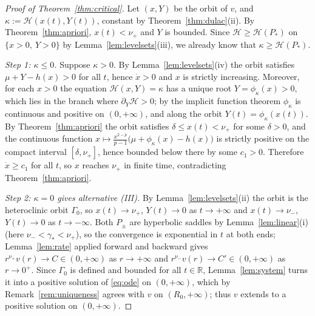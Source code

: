 \documentclass[11pt,reqno]{amsart}
\numberwithin{equation}{section}
\theoremstyle{plain}
\theoremstyle{definition}
\newcommand{\R}{\mathbb{R}}
\newcommand{\gs}{\gamma_{*}}
\begin{document}
\begin{proof}[Proof of Theorem~\ref{thm:critical}]
Let $(x,Y)$ be the orbit of $v$, and $\kappa:=\mathcal H(x(t),Y(t))$, constant by
Theorem~\ref{thm:dulac}(ii). By Theorem~\ref{thm:apriori}, $x(t)<\nu_{+}$ and
$Y$ is bounded. Since $\mathcal H\ge\mathcal H(P_{*})$ on $\{x>0,\ Y>0\}$ by
Lemma~\ref{lem:levelsets}(iii), we already know that
$\kappa\ge\mathcal H(P_{*})$.

\smallskip
\noindent\emph{Step 1: $\kappa\le0$.} Suppose $\kappa>0$. By
Lemma~\ref{lem:levelsets}(iv) the orbit satisfies $\mu+Y-h(x)>0$ for all $t$,
hence $\dot x>0$ and $x$ is strictly increasing. Moreover, for each $x>0$ the
equation $\mathcal H(x,Y)=\kappa$ has a unique root $Y=\phi_{\kappa}(x)>0$,
which lies in
the branch where $\partial_{Y}\mathcal H>0$; by the implicit function theorem
$\phi_{\kappa}$ is continuous and positive on $(0,+\infty)$, and along the orbit
$Y(t)=\phi_{\kappa}(x(t))$. By Theorem~\ref{thm:apriori} the orbit satisfies
$\delta\le x(t)<\nu_{+}$ for some $\delta>0$, and the continuous function
$x\mapsto\frac{x^{2-p}}{p-1}\big(\mu+\phi_{\kappa}(x)-h(x)\big)$ is strictly
positive on the compact interval $[\delta,\nu_{+}]$, hence bounded below there
by some $c_{1}>0$. Therefore $\dot x\ge c_{1}$ for all $t$, so $x$ reaches
$\nu_{+}$ in finite time, contradicting Theorem~\ref{thm:apriori}.

\smallskip
\noindent\emph{Step 2: $\kappa=0$ gives alternative {\rm(III)}.} By
Lemma~\ref{lem:levelsets}(ii) the orbit is the heteroclinic orbit
$\Gamma_{0}$, so $x(t)\to\nu_{+}$, $Y(t)\to0$ as $t\to+\infty$ and
$x(t)\to\nu_{-}$, $Y(t)\to0$ as $t\to-\infty$. Both $P_{\pm}$ are hyperbolic
saddles by Lemma~\ref{lem:linear}(i) (here $\nu_{-}<\gs<\nu_{+}$), so the
convergence is exponential in $t$ at both ends; Lemma~\ref{lem:rate} applied
forward and backward gives
$r^{\nu_{+}}v(r)\to C\in(0,+\infty)$ as $r\to+\infty$ and
$r^{\nu_{-}}v(r)\to C'\in(0,+\infty)$ as $r\to0^{+}$. Since $\Gamma_{0}$ is
defined and bounded for all $t\in\R$, Lemma~\ref{lem:system} turns it into a
positive solution of \eqref{eq:ode} on $(0,+\infty)$, which by
Remark~\ref{rem:uniqueness} agrees with $v$ on $(R_{0},+\infty)$; thus $v$
extends to a positive solution on $(0,+\infty)$.


\end{proof}
\end{document}
